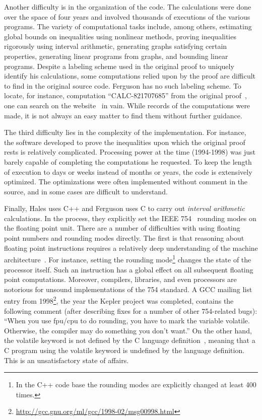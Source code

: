 \documentclass[11pt]{amsart}
\begin{document}
Another difficulty is in the organization of the code. The
calculations were done over the space of four years and involved %
thousands of executions of the various programs. The variety of
computational tasks include, among others, estimating global bounds on
inequalities using nonlinear methods, proving inequalities rigorously
using interval arithmetic, generating graphs satisfying certain
properties, generating linear programs from graphs, and bounding
linear programs. Despite a labeling scheme used in the original proof 
to uniquely
identify his calculations, some computations relied upon by the proof
are difficult to find in the original source code. 
Ferguson has no such labeling scheme.  To locate, for
instance, computation ``CALC-821707685'' from the original proof~\cite[p.159]{Hales:2006:DCG}, one can search on the website~\cite{website:Hales:1998:Code} in
vain.  While records
of the computations were made, it is not always an easy matter
to find them without further guidance.

The third difficulty lies in the complexity of the implementation. For instance,
the software  developed to prove the inequalities upon which the original
proof rests is relatively complicated. Processing power at the time
(1994-1998) was just barely capable of completing the computations he
requested. To keep the length of execution to days or weeks instead of
months or years, the code is extensively optimized. The
optimizations were often implemented without comment in the source,
and in some cases are difficult to understand.  

Finally, Hales uses C++ and Ferguson uses C to carry out
\emph{interval arithmetic} calculations. In the process, they
explicitly set the IEEE 754~\cite{IEEE:1985:IEE754} rounding modes on
the floating point unit. There are a number of difficulties with using
floating point numbers and rounding modes directly. The first is that
reasoning about floating point instructions requires a relatively deep
understanding of the machine architecture~\cite{Monniaux:2008:TOPLAS}.
For instance, setting the rounding mode\footnote{In the C++ code
base the rounding modes are explicitly changed at least 400 times.}
changes the state of the processor itself. Such an instruction has a
global effect on all subsequent floating point computations. Moreover,
compilers, libraries, and even processors are notorious for unsound
implementations of the 754 standard. A GCC mailing list entry from
1998\footnote{\url{http://gcc.gnu.org/ml/gcc/1998-02/msg00998.html}},
the year the Kepler project was completed, contains the following
comment (after describing fixes for a number of other 754-related
bugs): ``When you use fpu/cpu to do rounding, you have to mark the
variable volatile. Otherwise, the compiler may do something  you don't
want.'' On the other hand, the volatile keyword is not defined by
the C language definition~\cite{Kernighan:1988:C}, meaning that a C
program using the volatile keyword is undefined by the
language definition. This is an unsatisfactory state of affairs.
\end{document}

